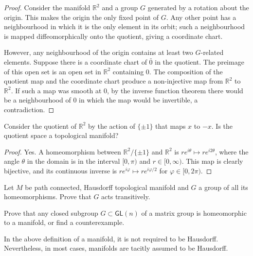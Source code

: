 \begin{proof}
Consider the manifold $\mathbb{R}^2$ and a
group $G$ generated by a rotation about the
origin. This makes the origin the only fixed
point of $G$. Any other point has a
neighbourhood in which it is the only
element in its orbit; such a neighbourhood
is mapped diffeomorphically onto the
quotient, giving a coordinate chart.

However, any neighbourhood of the origin
contains at least two $G$-related elements.
Suppose there is a coordinate chart of
$\bar{0}$ in the quotient. The preimage of
this open set is an open set in
$\mathbb{R}^2$ containing $0$. The
composition of the quotient map and the
coordinate chart produce a non-injective map
from $\mathbb{R}^2$ to $\mathbb{R}^2$. If
such a map was smooth at $0$, by the inverse
function theorem there would be a
neighbourhood of $0$ in which the map would
be invertible, a contradiction.
\end{proof}

\begin{exercise}
\label{exercise-quotient-by-minus-one}
Consider the quotient of $\mathbb{R}^2$ by
the action of $\{\pm 1\}$ that maps $x$ to
$-x$. Is the quotient space a topological
manifold?
\end{exercise}

\begin{proof}
Yes. A homeomorphism between
$\mathbb{R}^2/\{\pm 1\}$ and $\mathbb{R}^2$
is $re^{i\theta} \mapsto re^{i2\theta}$,
where the angle $\theta$ in the domain is
in the interval $[0,\pi)$ and
$r \in [0,\infty)$. This map is clearly
bijective, and its continuous inverse is
$re^{i\varphi} \mapsto re^{i\varphi/2}$ for
$\varphi \in [0,2\pi)$.
\end{proof}

\begin{exercise}
\label{exercise-homeomorphism-group-transitive}
Let $M$ be path connected, Hausdorff
topological manifold and $G$ a group of all
its homeomorphisms. Prove that $G$ acts
transitively.
\end{exercise}

\begin{exercise}
\label{exercise-closed-subgroup-manifold}
Prove that any closed subgroup
$G \subset \mathsf{GL}(n)$ of a matrix
group is homeomorphic to a manifold, or find
a counterexample.
\end{exercise}

\medskip\noindent
In the above definition of a manifold, it is
not required to be Hausdorff. Nevertheless,
in most cases, manifolds are tacitly assumed
to be Hausdorff.

